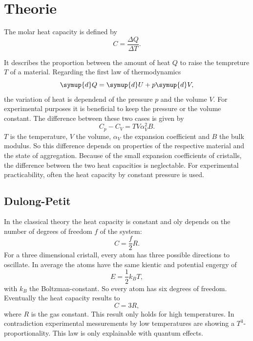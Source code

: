 \section{Theorie}
\label{sec:Theorie}

The molar heat capacity is defined by 
\begin{equation}
    C = \frac{\Delta Q}{\Delta T}.
\end{equation}

It describes the proportion between the amount of heat $Q$ to raise the tempreture $T$ of a material. 
Regarding the first law of thermodynamics
\begin{equation}
    \symup{d}Q = \symup{d}U+p\symup{d}V,
\end{equation}
the variation of heat is dependend of the pressure $p$ and the volume $V$.
For experimental purposes it is beneficial to keep the pressure or the volume constant.
The difference between these two cases is given by
\begin{equation}
    C_p - C_V = TV \alpha_V^2 B.
\end{equation}
$T$ is the temperature, $V$ the volume, $\alpha_V$ the expansion coefficient and $B$ the bulk modulus.
So this difference depends on properties of the respective material and the state of aggregation. 
Because of the small expansion coefficients of cristalls, the difference between the two heat capacities is neglectable.
For experimental practicability, often the heat capacity by constant pressure is used.


\subsection{Dulong-Petit}
In the classical theory the heat capacity is constant and oly depends on the number of degrees of freedom $f$ of the system:
\begin{equation}
    C = \frac{f}{2} R.
\end{equation} 
For a three dimensional cristall, every atom has three possible directions to oscillate. 
In average the atoms have the same kientic and potential engergy of 
\begin{equation}
    E = \frac{1}{2}k_B T,
\end{equation}
with $k_B$ the Boltzman-constant.
So every atom has six degrees of freedom. 
Eventually the heat capacity results to
\begin{equation}
    C = 3 R,
\end{equation}
where $R$ is the gas constant.
This result only holds for high temperatures. 
In contradiction experimental messurements by low temperatures are showing a $T^3$-proportionality.
This law is only explainable with quantum effects.

